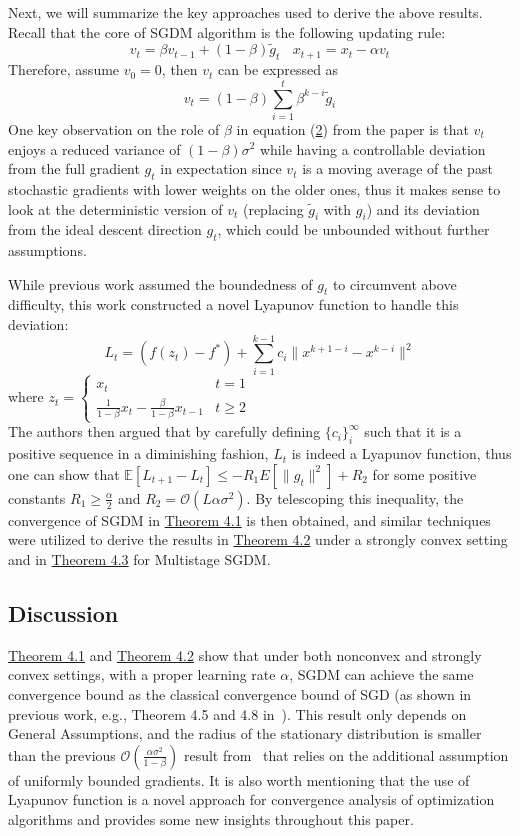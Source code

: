\documentclass{article}
\begin{document}
Next, we will summarize the key approaches used to derive the above results. Recall that the core of SGDM algorithm is the following updating rule:
\[
v_t = \beta v_{t - 1} + (1 - \beta)\tilde{g}_t \ \ \ \
x_{t + 1} = x_t - \alpha v_t
\]
Therefore, assume $v_0 = 0$, then $v_t$ can be expressed as 
\begin{equation}
\label{eq42}
v_t = (1 - \beta)\sum_{i = 1}^{t}\beta^{k - i}\tilde{g}_i
\end{equation}
One key observation on the role of $\beta$ in equation (\hyperref[eq42]{2}) from the paper is that $v_t$ enjoys a reduced variance of $(1 - \beta)\sigma^2$ while having a controllable deviation from the full gradient $g_t$ in expectation since $v_t$ is a moving average of the past stochastic gradients with lower weights on the older ones, thus it makes sense to look at the deterministic version of $v_t$ (replacing $\tilde{g}_i$ with $g_i$) and its deviation from the ideal descent direction $g_t$, which could be unbounded without further assumptions.

While previous work assumed the boundedness of $g_t$ to circumvent above difficulty, this work constructed a novel Lyapunov function to handle this deviation:
\[
L_t = (f(z_t) - f^*) + \sum_{i = 1}^{k - 1}c_i\|x^{k + 1 - i} - x^{k - i}\|^2
\]
where $z_t = \begin{cases}
	x_t & t = 1 \\
	\frac{1}{1 - \beta}x_t - \frac{\beta}{1 - \beta}x_{t - 1} & t \geq 2
\end{cases}$\\

The authors then argued that by carefully defining $\{c_i\}_i^\infty$ such that it is a positive sequence in a diminishing fashion, $L_t$ is indeed a Lyapunov function, thus one can show that $\mathbb{E}[L_{t + 1} - L_t] \leq -R_1E[\|g_t\|^2] + R_2$ for some positive constants $R_1 \geq \frac{\alpha}{2}$ and $R_2 = \mathcal{O}(L\alpha\sigma^2)$. By telescoping this inequality, the convergence of SGDM in \hyperref[theom41]{Theorem 4.1} is then obtained, and similar techniques were utilized to derive the results in \hyperref[theom42]{Theorem 4.2} under a strongly convex setting and in \hyperref[theom43]{Theorem 4.3} for Multistage SGDM.
\subsection{Discussion}
\hyperref[theom41]{Theorem 4.1} and \hyperref[theom42]{Theorem 4.2} show that under both nonconvex and strongly convex settings, with a proper learning rate $\alpha$, SGDM can achieve the same convergence bound as the classical convergence bound of SGD (as shown in previous work, e.g., Theorem 4.5 and 4.8 in~\cite{https://doi.org/10.48550/arxiv.1606.04838}). This result only depends on General Assumptions, and the radius of the stationary distribution is smaller than the previous $\mathcal{O}(\frac{\alpha\sigma^2}{1 - \beta})$ result from~\cite{https://doi.org/10.48550/arxiv.1905.03817} that relies on the additional assumption of uniformly bounded gradients. It is also worth mentioning that the use of Lyapunov function is a novel approach for convergence analysis of optimization algorithms and provides some new insights throughout this paper. 
\end{document}
